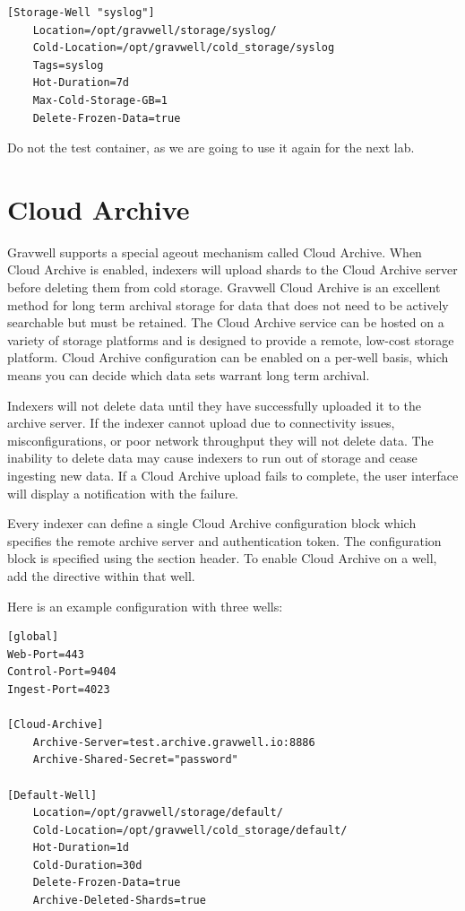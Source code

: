 {{\begin{Verbatim}[breaklines=true]
[Storage-Well "syslog"]
    Location=/opt/gravwell/storage/syslog/
    Cold-Location=/opt/gravwell/cold_storage/syslog
    Tags=syslog
    Hot-Duration=7d
    Max-Cold-Storage-GB=1
    Delete-Frozen-Data=true
\end{Verbatim}

Do not  the test container, as we are
going to use it again for the next lab.

\clearpage
\section{Cloud Archive}
Gravwell supports a special ageout mechanism called Cloud Archive.  When Cloud Archive is enabled, indexers will upload shards to the Cloud Archive server before deleting them from cold storage.  Gravwell Cloud Archive is an excellent method for long term archival storage for data that does not need to be actively searchable but must be retained.  The Cloud Archive service can be hosted on a variety of storage platforms and is designed to provide a remote, low-cost storage platform.  Cloud Archive configuration can be enabled on a per-well basis, which means you can decide which data sets warrant long term archival.

Indexers will not delete data until they have successfully uploaded it to the archive server.  If the indexer cannot upload due to connectivity issues, misconfigurations, or poor network throughput they will not delete data.  The inability to delete data may cause indexers to run out of storage and cease ingesting new data.  If a Cloud Archive upload fails to complete, the user interface will display a notification with the failure.

Every indexer can define a single Cloud Archive configuration block which specifies the remote archive server and authentication token. The configuration block is specified using the  section header.  To enable Cloud Archive on a well, add the  directive within that well.

Here is an example configuration with three wells:

\begin{verbatim}
[global]
Web-Port=443
Control-Port=9404
Ingest-Port=4023

[Cloud-Archive]
	Archive-Server=test.archive.gravwell.io:8886
	Archive-Shared-Secret="password"

[Default-Well]
	Location=/opt/gravwell/storage/default/
	Cold-Location=/opt/gravwell/cold_storage/default/
	Hot-Duration=1d
	Cold-Duration=30d
	Delete-Frozen-Data=true
	Archive-Deleted-Shards=true


\end{verbatim}}}
